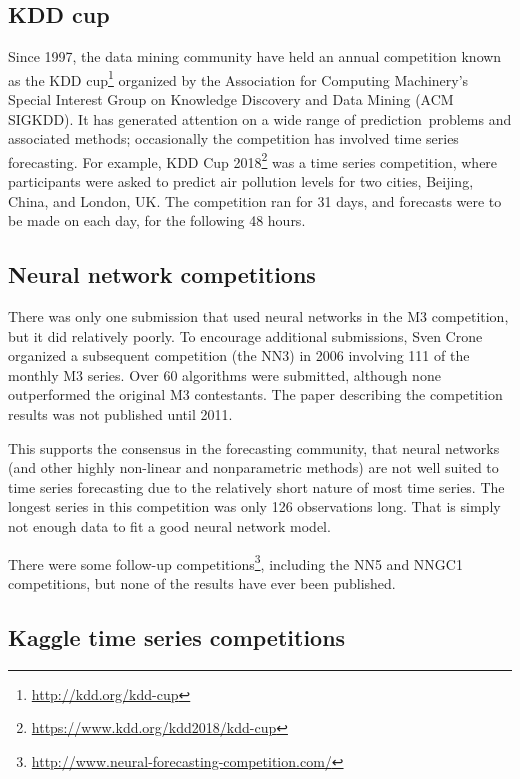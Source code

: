 \documentclass[11pt,a4paper,]{article}
\begin{document}
\hypertarget{kdd-cup}{%
\subsection*{KDD cup}\label{kdd-cup}}

Since 1997, the data mining community have held an annual competition known as the KDD cup\footnote{\url{http://kdd.org/kdd-cup}} organized by the Association for Computing Machinery's Special Interest Group on Knowledge Discovery and Data Mining (ACM SIGKDD). It has generated attention on a wide range of prediction~problems and associated methods; occasionally the competition has involved time series forecasting. For example, KDD Cup 2018\footnote{\url{https://www.kdd.org/kdd2018/kdd-cup}} was a time series competition, where participants were asked to predict air pollution levels for two cities, Beijing, China, and London, UK. The competition ran for 31 days, and forecasts were to be made on each day, for the following 48 hours.

\hypertarget{neural-network-competitions}{%
\subsection*{Neural network competitions}\label{neural-network-competitions}}

There was only one submission that used neural networks in the M3 competition, but it did relatively poorly. To encourage additional submissions, Sven Crone organized a subsequent competition (the NN3) in 2006 involving 111 of the monthly M3 series. Over 60 algorithms were submitted, although none outperformed the original M3 contestants. The paper describing the competition results \autocite{NN3} was not published until 2011.

This supports the consensus in the forecasting community, that neural networks (and other highly non-linear and nonparametric methods) are not well suited to time series forecasting due to the relatively short nature of most time series. The longest series in this competition was only 126 observations long. That is simply not enough data to fit a good neural network model.

There were some follow-up competitions\footnote{\url{http://www.neural-forecasting-competition.com/}}, including the NN5 and NNGC1 competitions, but none of the results have ever been published.

\hypertarget{kaggle-time-series-competitions}{%
\subsection*{Kaggle time series competitions}\label{kaggle-time-series-competitions}}
\end{document}
